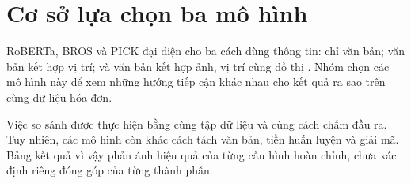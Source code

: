 \section{Cơ sở lựa chọn ba mô hình}
RoBERTa, BROS và PICK đại diện cho ba cách dùng thông tin: chỉ văn bản; văn bản kết hợp vị trí; và văn bản kết hợp ảnh, vị trí cùng đồ thị \parencite{liu2019,hong2022,yu2020}. Nhóm chọn các mô hình này để xem những hướng tiếp cận khác nhau cho kết quả ra sao trên cùng dữ liệu hóa đơn.

Việc so sánh được thực hiện bằng cùng tập dữ liệu và cùng cách chấm đầu ra. Tuy nhiên, các mô hình còn khác cách tách văn bản, tiền huấn luyện và giải mã. Bảng kết quả vì vậy phản ánh hiệu quả của từng cấu hình hoàn chỉnh, chưa xác định riêng đóng góp của từng thành phần.
